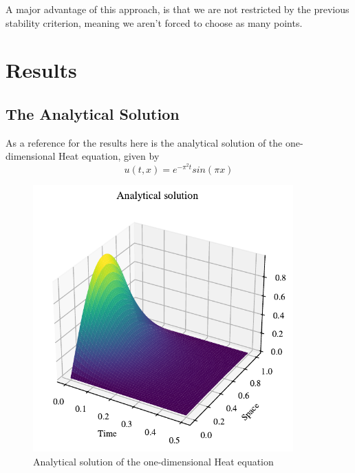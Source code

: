 \documentclass{article}
\theoremstyle{definition}
\begin{document}
A major advantage of this approach, is that we are not restricted by the previous stability criterion, meaning we aren't forced to choose as many points.

\newpage

\section{Results}

\subsection{The Analytical Solution}
As a reference for the results here is the analytical solution of the one-dimensional Heat equation, given by
\[
u(t,x) = e^{-\pi^2 t}sin(\pi x)
\]

\begin{figure}[H]%
    \centering
    \includegraphics[width=10cm]{Project3/figures/1dHeat/Analytical_sol.pdf}
    \caption{Analytical solution of the one-dimensional Heat equation }
    \label{fig:Analytic}
\end{figure}
\end{document}
